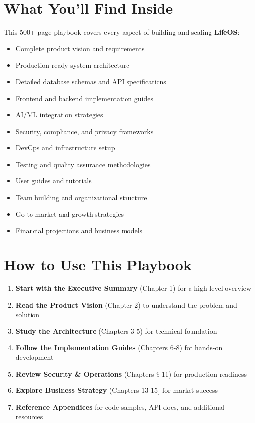 \documentclass[12pt,a4paper,twoside,openright]{book}
\newcommand{\lifeos}{\textbf{LifeOS}}
\begin{document}
\section*{What You'll Find Inside}

This 500+ page playbook covers every aspect of building and scaling \lifeos{}:

\begin{itemize}
    \item Complete product vision and requirements
    \item Production-ready system architecture
    \item Detailed database schemas and API specifications
    \item Frontend and backend implementation guides
    \item AI/ML integration strategies
    \item Security, compliance, and privacy frameworks
    \item DevOps and infrastructure setup
    \item Testing and quality assurance methodologies
    \item User guides and tutorials
    \item Team building and organizational structure
    \item Go-to-market and growth strategies
    \item Financial projections and business models
\end{itemize}

\section*{How to Use This Playbook}

\begin{enumerate}
    \item \textbf{Start with the Executive Summary} (Chapter 1) for a high-level overview
    \item \textbf{Read the Product Vision} (Chapter 2) to understand the problem and solution
    \item \textbf{Study the Architecture} (Chapters 3-5) for technical foundation
    \item \textbf{Follow the Implementation Guides} (Chapters 6-8) for hands-on development
    \item \textbf{Review Security \& Operations} (Chapters 9-11) for production readiness
    \item \textbf{Explore Business Strategy} (Chapters 13-15) for market success
    \item \textbf{Reference Appendices} for code samples, API docs, and additional resources
\end{enumerate}
\end{document}
